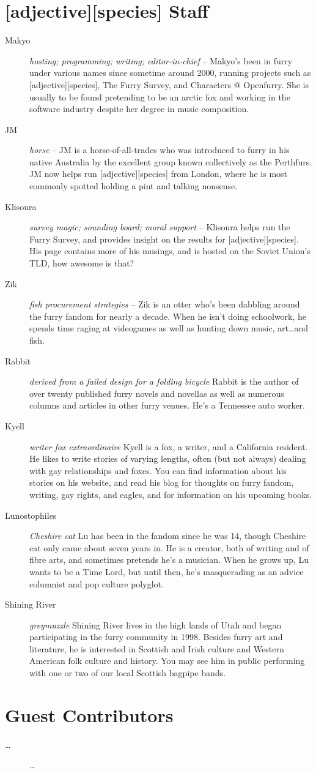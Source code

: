 \section*{[adjective][species] Staff}

\begin{description}
  \item[Makyo] \textit{hosting; programming; writing; editor-in-chief} -- Makyo's been in furry under various names since sometime around 2000, running projects such as [adjective][species], The Furry Survey, and Characters @ Openfurry.  She is usually to be found pretending to be an arctic fox and working in the software industry despite her degree in music composition.
  \item[JM] \textit{horse} -- JM is a horse-of-all-trades who was introduced to furry in his native Australia by the excellent group known collectively as the Perthfurs. JM now helps run [adjective][species] from London, where he is most commonly spotted holding a pint and talking nonsense.
  \item[Klisoura] \textit{survey magic; sounding board; moral support} -- Klisoura helps run the Furry Survey, and provides insight on the results for [adjective][species]. His page contains more of his musings, and is hosted on the Soviet Union's TLD, how awesome is that?
  \item[Zik] \textit{fish procurement strategies} -- Zik is an otter who's been dabbling around the furry fandom for nearly a decade. When he isn't doing schoolwork, he spends time raging at videogames as well as hunting down music, art\ldots and fish.
  \item[Rabbit] \textit{derived from a failed design for a folding bicycle} Rabbit is the author of over twenty published furry novels and novellas as well as numerous columns and articles in other furry venues. He’s a Tennessee auto worker.
  \item[Kyell] \textit{writer fox extraordinaire} Kyell is a fox, a writer, and a California resident. He likes to write stories of varying lengths, often (but not always) dealing with gay relationships and foxes. You can find information about his stories on his website, and read his blog for thoughts on furry fandom, writing, gay rights, and eagles, and for information on his upcoming books.
  \item[Lunostophiles] \textit{Cheshire cat} Lu has been in the fandom since he was 14, though Cheshire cat only came about seven years in. He is a creator, both of writing and of fibre arts, and sometimes pretends he’s a musician. When he grows up, Lu wants to be a Time Lord, but until then, he’s masquerading as an advice columnist and pop culture polyglot.
  \item[Shining River] \textit{greymuzzle} Shining River lives in the high lands of Utah and began participating in the furry community in 1998. Besides furry art and literature, he is interested in Scottish and Irish culture and Western American folk culture and history. You may see him in public performing with one or two of our local Scottish bagpipe bands.
\end{description}

\section*{Guest Contributors}

\begin{description}
  \item[\ldots] \ldots
\end{description}
